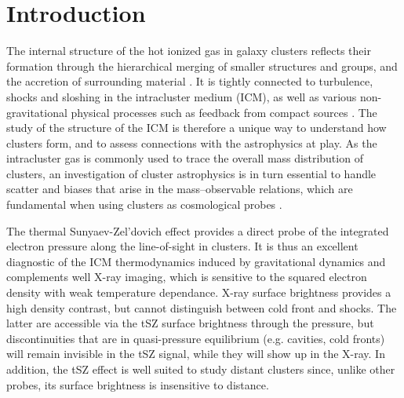 \documentclass[twocolumn,traditabstract]{aa}
\begin{document}
\section{Introduction}
The internal structure of the hot ionized gas in galaxy clusters reflects their formation through the hierarchical merging of smaller structures and groups, and the accretion of surrounding material \citep[e.g.][and references therein]{Kravtsov2012}. It is tightly connected to turbulence, shocks and sloshing \citep[e.g.][]{Markevitch2007} in the intracluster medium (ICM), as well as various non-gravitational physical processes such as feedback from compact sources \citep[e.g.][]{Fabian2012}. The study of the structure of the ICM is therefore a unique way to understand how clusters form, and to assess connections with the astrophysics at play. As the intracluster gas is commonly used to trace the overall mass distribution of clusters, an investigation of cluster astrophysics is in turn essential to handle scatter and biases that arise in the mass--observable relations, which are fundamental when using clusters as cosmological probes \citep[see, e.g.][for a review]{Allen2011}.

The thermal Sunyaev-Zel'dovich \citep[tSZ,][]{Sunyaev1972} effect provides a direct probe of the integrated electron pressure along the line-of-sight in clusters. It is thus an excellent diagnostic of the ICM thermodynamics induced by gravitational dynamics and complements well X-ray imaging, which is sensitive to the squared electron density with weak temperature dependance. X-ray surface brightness provides a high density contrast, but cannot distinguish between cold front and shocks. The latter are accessible via the tSZ surface brightness through the pressure, but discontinuities that are in quasi-pressure equilibrium (e.g. cavities, cold fronts) will remain invisible in the tSZ signal, while they will show up in the X-ray. In addition, the tSZ effect is well suited to study distant clusters since, unlike other probes, its surface brightness is insensitive to distance.
\end{document}

